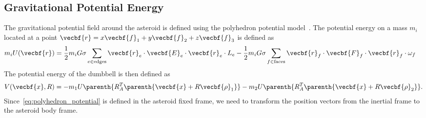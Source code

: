 \documentclass[11pt, reqno]{article}    %
\begin{document}
\subsection{Gravitational Potential Energy}\label{ssec:potential_energy}
The gravitational potential field around the asteroid is defined using the polyhedron potential model~\cite{werner1994,werner1996}.
The potential energy on a mass \( m_i \) located at a point \( \vecbf{r} = x \vecbf{f}_1 + y \vecbf{f}_2 + z \vecbf{f}_3 \) is defined as
\begin{align}\label{eq:polyhedron_potential}
    m_i U(\vecbf{r}) &= \frac{1}{2} m_i G \sigma \sum_{e \in \text{edges}} \vecbf{r}_e \cdot \vecbf{E}_e \cdot \vecbf{r}_e \cdot L_e - \frac{1}{2} m_i G \sigma \sum_{f \in \text{faces}} \vecbf{r}_f \cdot \vecbf{F}_f \cdot \vecbf{r}_f \cdot \omega_f 
\end{align}
The potential energy of the dumbbell is then defined as
\begin{align}\label{eq:potential_energy}
    V( \vecbf{x}, R ) =  - m_1 U \parenth{R_A^T \parenth{\vecbf{x} + R \vecbf{\rho}_1}} - m_2 U \parenth{R_A^T \parenth{\vecbf{x} + R \vecbf{\rho}_2}} .
\end{align}
Since~\cref{eq:polyhedron_potential} is defined in the asteroid fixed frame, we need to transform the position vectors from the inertial frame to the asteroid body frame.
\end{document}
